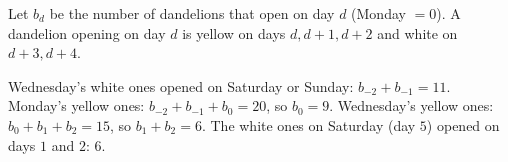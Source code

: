 Let $b_d$ be the number of dandelions that open on day $d$ (Monday $=0$). A dandelion opening on day $d$ is yellow on days $d,d+1,d+2$ and white on $d+3,d+4$.

Wednesday's white ones opened on Saturday or Sunday: $b_{-2}+b_{-1}=11$. Monday's yellow ones: $b_{-2}+b_{-1}+b_0=20$, so $b_0=9$. Wednesday's yellow ones: $b_0+b_1+b_2=15$, so $b_1+b_2=6$. The white ones on Saturday (day $5$) opened on days $1$ and $2$: $\boxed{6}$.

